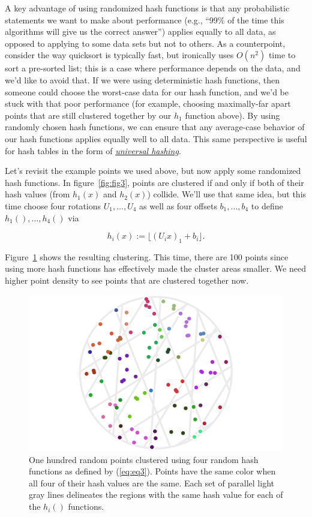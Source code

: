 \documentclass[20pt,]{extarticle}
\begin{document}
A key advantage of using randomized hash functions is that any
probabilistic statements we want to make about performance (e.g., ``99\%
of the time this algorithms will give us the correct answer'') applies
equally to all data, as opposed to applying to some data sets but not to
others. As a counterpoint, consider the way quicksort is typically fast,
but ironically uses \(O(n^2)\) time to sort a pre-sorted list; this is a
case where performance depends on the data, and we'd like to avoid that.
If we were using deterministic hash functions, then someone could choose
the worst-case data for our hash function, and we'd be stuck with that
poor performance (for example, choosing maximally-far apart points that
are still clustered together by our \(h_1\) function above). By using
randomly chosen hash functions, we can ensure that any average-case
behavior of our hash functions applies equally well to all data. This
same perspective is useful for hash tables in the form of
\href{https://en.wikipedia.org/wiki/Universal_hashing}{\emph{universal
hashing}}.

Let's revisit the example points we used above, but now apply some
randomized hash functions. In figure~\ref{fig:fig3}, points are
clustered if and only if both of their hash values (from \(h_1(x)\) and
\(h_2(x)\)) collide. We'll use that same idea, but this time choose four
rotations \(U_1, \ldots, U_4\) as well as four offsets
\(b_1, \ldots, b_4\) to define \(h_1(), \ldots, h_4()\) via

\begin{equation} h_i(x) := \lfloor (U_i x)_1 + b_i \rfloor. \label{eq:eq3}\end{equation}

Figure~\ref{fig:fig4} shows the resulting clustering. This time, there
are 100 points since using more hash functions has effectively made the
cluster areas smaller. We need higher point density to see points that
are clustered together now.

\begin{figure}
\centering
\includegraphics{images/lsh_image4.png}
\caption{One hundred random points clustered using four random hash
functions as defined by (\ref{eq:eq3}). Points have the same color when
all four of their hash values are the same. Each set of parallel light
gray lines delineates the regions with the same hash value for each of
the \(h_i()\) functions.}\label{fig:fig4}
\end{figure}
\end{document}
